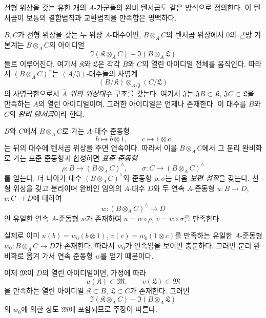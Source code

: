 \begin{env}[7.7.4]
\label{0.7.7.4-ko}
선형 위상을 갖는 유한 개의 $A$-가군들의 완비 텐서곱도 같은 방식으로
정의한다. 이 텐서곱이 보통의 결합법칙과 교환법칙을 만족함은
명백하다.
\end{env}

\begin{env}[7.7.5]
\label{0.7.7.5-ko}
$B,C$가 선형 위상을 갖는 두 위상 $A$-대수이면, $B\otimes_A C$의
텐서곱 위상에서 $0$의 근방 기본계는 $B\otimes_A C$의 아이디얼
\[
  \Im(\mathfrak K\otimes_A C)+
  \Im(B\otimes_A\mathfrak L)
\]
들로 이루어진다. 여기서 $\mathfrak K$와 $\mathfrak L$은 각각
$B$와 $C$의 열린 아이디얼 전체를 움직인다. 따라서
$(B\otimes_A C)^\wedge$는 $(A/\mathfrak J)$-대수들의 사영계
\[
  (B/\mathfrak K)\otimes_{A/\mathfrak J}(C/\mathfrak L)
\]
의 사영극한으로서 \emph{$\widehat A$ 위의 위상대수} 구조를 갖는다.
여기서 $\mathfrak J$는
$\mathfrak J B\subset\mathfrak K$,
$\mathfrak J C\subset\mathfrak L$을 만족하는 $A$의 열린 아이디얼이며,
그러한 아이디얼은 언제나 존재한다. 이 대수를 $B$와 $C$의
\emph{완비 텐서곱}이라 한다.
\end{env}

\begin{env}[7.7.6]
\label{0.7.7.6-ko}
$B$와 $C$에서 $B\otimes_A C$로 가는 $A$-대수 준동형
\[
  b\longmapsto b\otimes1,
  \qquad
  c\longmapsto1\otimes c
\]
는 뒤의 대수에 텐서곱 위상을 주면 연속이다. 따라서 이를
$B\otimes_A C$에서 그 분리 완비화로 가는 표준 준동형과 합성하면
\emph{표준 준동형}
\[
  \rho:B\longrightarrow(B\otimes_A C)^\wedge,
  \qquad
  \sigma:C\longrightarrow(B\otimes_A C)^\wedge
\]
를 얻는다. 더 나아가 대수 $(B\otimes_A C)^\wedge$와 준동형
$\rho,\sigma$는 다음 \emph{보편 성질}을 갖는다. 선형 위상을 갖고
분리이며 완비인 임의의 $A$-대수 $D$와 두 연속 $A$-준동형
$u:B\to D$, $v:C\to D$에 대하여
\[
  w:(B\otimes_A C)^\wedge\longrightarrow D
\]
인 유일한 연속 $A$-준동형 $w$가 존재하여
$u=w\circ\rho$, $v=w\circ\sigma$를 만족한다.

실제로 이미 $u(b)=w_0(b\otimes1)$,
$v(c)=w_0(1\otimes c)$를 만족하는 유일한 $A$-준동형
$w_0:B\otimes_A C\to D$가 존재한다. 따라서 $w_0$가 연속임을
보이면 충분하다. 그러면 분리 완비화로 옮겨 가서 연속 준동형 $w$를
얻기 때문이다.


이제 $\mathfrak M$이 $D$의 열린 아이디얼이면, 가정에
따라
\[
  u(\mathfrak K)\subset\mathfrak M,
  \qquad
  v(\mathfrak L)\subset\mathfrak M
\]
을 만족하는 열린 아이디얼
$\mathfrak K\subset B$, $\mathfrak L\subset C$가 존재한다. 그러면
\[
  \Im(\mathfrak K\otimes_A C)+
  \Im(B\otimes_A\mathfrak L)
\]
의 $w_0$에 의한 상도 $\mathfrak M$에 포함되므로 주장이 따른다.
\end{env}

